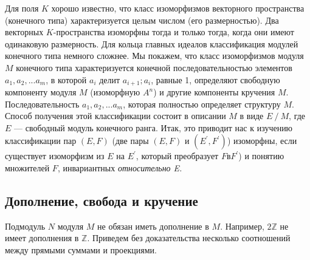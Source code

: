 Для поля $K$ хорошо известно, что класс изоморфизмов векторного пространства (конечного типа) характеризуется целым числом (его размерностью). Два векторных $K$-пространства изоморфны тогда и только тогда, когда они имеют одинаковую размерность. Для кольца главных идеалов классификация модулей конечного типа немного сложнее. Мы покажем, что класс изоморфизмов модуля $M$ конечного типа характеризуется конечной последовательностью элементов $a_1, a_2, ...a_m$, в которой $a_i$ делит $a_{i+1}; a_i$, равные 1, определяют свободную компоненту модуля $M$ (изоморфную $A^{n}$) и другие компоненты кручения $M$. Последовательность $a_1, a_2, ...a_m$, которая полностью определяет структуру $M$. Способ получения этой классификации состоит в описании $M$ в виде $E~/~M$, где $E$ — свободный модуль конечного ранга. Итак, это приводит нас к изучению классификации пар $(E,F)$ (две пары $(E,F)$ и $(E^{'},F^{'})$) изоморфны, если существует изоморфизм из $E$ на $E^{'}$, который преобразует $F в F^{'}$) и понятию множителей $F$, инвариантных \textit{относительно E.}

\subsection{Дополнение, свобода и кручение}

\noindent Подмодуль $N$ модуля $M$ не обязан иметь дополнение в $M$. Например, $2\mathbb{Z}$ не имеет дополнения в $\mathbb{Z}$. Приведем без доказательства несколько соотношений между прямыми суммами и проекциями.\\

